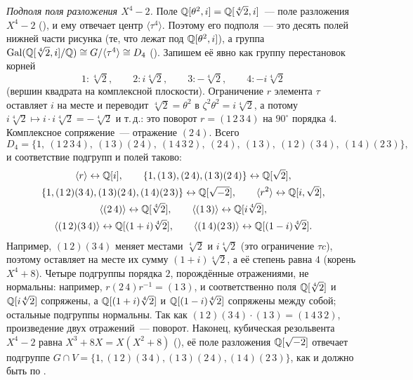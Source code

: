 \begin{remark}
\emph{Подполя поля разложения $X^4-2$.} Поле $\mathbb Q[\theta^2,i]=\mathbb Q[\sqrt[4]2,i]$~--- поле разложения $X^4-2$ (), и ему отвечает центр $\langle\tau^4\rangle$.
Поэтому его подполя~--- это десять полей нижней части рисунка (те, что лежат под $\mathbb Q[\theta^2,i]$), а группа
$\operatorname{Gal}(\mathbb Q[\sqrt[4]2,i]/\mathbb Q)\cong G/\langle\tau^4\rangle\cong D_4$ (). Запишем её явно как группу перестановок корней
\[
1\colon\sqrt[4]2,\qquad 2\colon i\sqrt[4]2,\qquad 3\colon-\sqrt[4]2,\qquad 4\colon -i\sqrt[4]2
\]
(вершин квадрата на комплексной плоскости). Ограничение $r$ элемента $\tau$ оставляет $i$ на месте и переводит
$\sqrt[4]2=\theta^2$ в $\zeta^2\theta^2=i\sqrt[4]2$, а потому $i\sqrt[4]2\mapsto i\cdot i\sqrt[4]2=-\sqrt[4]2$ и т.\,д.: это поворот
$r=(1\,2\,3\,4)$ на $90^\circ$ порядка $4$. Комплексное сопряжение~--- отражение $(2\,4)$. Всего
\[
D_4=\{1,\ (1\,2\,3\,4),\ (1\,3)(2\,4),\ (1\,4\,3\,2),\ (2\,4),\ (1\,3),\ (1\,2)(3\,4),\ (1\,4)(2\,3)\},
\]
и соответствие подгрупп и полей таково:
\[
\begin{gathered}
\langle r\rangle\leftrightarrow\mathbb Q[i],\qquad \{1,(1\,3),(2\,4),(1\,3)(2\,4)\}\leftrightarrow\mathbb Q[\sqrt2],\\
\{1,(1\,2)(3\,4),(1\,3)(2\,4),(1\,4)(2\,3)\}\leftrightarrow\mathbb Q[\sqrt{-2}],\qquad
\langle r^2\rangle\leftrightarrow\mathbb Q[i,\sqrt2],\\
\langle(2\,4)\rangle\leftrightarrow\mathbb Q[\sqrt[4]2],\qquad
\langle(1\,3)\rangle\leftrightarrow\mathbb Q[i\sqrt[4]2],\\
\langle(1\,2)(3\,4)\rangle\leftrightarrow\mathbb Q[(1+i)\sqrt[4]2],\qquad \langle(1\,4)(2\,3)\rangle\leftrightarrow\mathbb Q[(1-i)\sqrt[4]2].
\end{gathered}
\]
Например, $(1\,2)(3\,4)$ меняет местами $\sqrt[4]2$ и $i\sqrt[4]2$ (это ограничение $\tau c$), поэтому оставляет на месте их
сумму $(1+i)\sqrt[4]2$, а её степень равна $4$ (корень $X^4+8$). Четыре подгруппы порядка $2$, порождённые отражениями, не
нормальны: например, $r(2\,4)r^{-1}=(1\,3)$, и соответственно поля $\mathbb Q[\sqrt[4]2]$ и $\mathbb Q[i\sqrt[4]2]$ сопряжены, а
$\mathbb Q[(1+i)\sqrt[4]2]$ и $\mathbb Q[(1-i)\sqrt[4]2]$ сопряжены между собой; остальные подгруппы нормальны. Так как
$(1\,2)(3\,4)\cdot(1\,3)=(1\,4\,3\,2)$, произведение двух отражений~--- поворот. Наконец, кубическая резольвента
$X^4-2$ равна $X^3+8X=X(X^2+8)$ (), её поле разложения $\mathbb Q[\sqrt{-2}]$ отвечает подгруппе
$G\cap V=\{1,(1\,2)(3\,4),(1\,3)(2\,4),(1\,4)(2\,3)\}$, как и должно быть по .
\end{remark}

